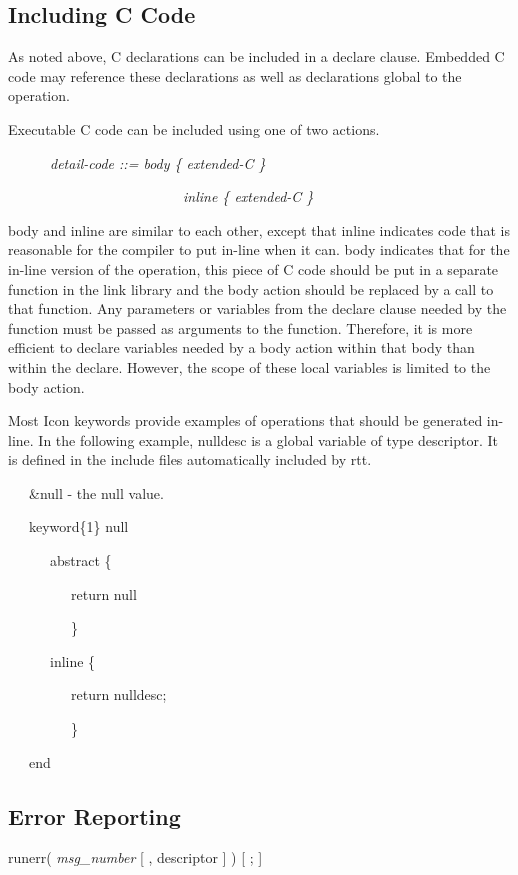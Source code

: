 \subsection{Including C Code}

As noted above, C declarations can be included in a declare
clause. Embedded C code may reference these declarations as well as
declarations global to the operation.

Executable C code can be included using one of two actions. 

{\ttfamily\mdseries
\ \ \ \ \ \ \textit{detail-code ::= body \{ extended-C \} {\textbar}}}

{\ttfamily\mdseries
\ \ \ \ \ \ \ \ \ \ \ \ \ \ \ \ \ \ \ \ \ \ \ \ \ \textit{inline \{ extended-C \}}}


body and inline are similar to each other, except that inline
indicates code that is reasonable for the compiler to put in-line when
it can. body indicates that for the in-line version of the operation,
this piece of C code should be put in a separate function in the link
library and the body action should be replaced by a call to that
function. Any parameters or variables from the declare clause needed
by the function must be passed as arguments to the function.
Therefore, it is more efficient to declare variables needed by a body
action within that body than within the declare.  However, the scope
of these local variables is limited to the body action.

Most Icon keywords provide examples of operations that should be
generated in-line. In the following example, nulldesc is a global
variable of type descriptor. It is defined in the include files
automatically included by rtt.

{\ttfamily\mdseries
\ \ \ \&null - the null value.}

{\ttfamily\mdseries
\ \ \ keyword\{1\} null}

{\ttfamily\mdseries
\ \ \ \ \ \ abstract \{}

{\ttfamily\mdseries
\ \ \ \ \ \ \ \ \ return null}

{\ttfamily\mdseries
\ \ \ \ \ \ \ \ \ \}}

{\ttfamily\mdseries
\ \ \ \ \ \ inline \{}

{\ttfamily\mdseries
\ \ \ \ \ \ \ \ \ return nulldesc;}

{\ttfamily\mdseries
\ \ \ \ \ \ \ \ \ \}}

{\ttfamily\mdseries
\ \ \ end}

\subsection{Error Reporting}
{\ttfamily\mdseries
runerr( \textit{msg\_number} [ , descriptor ] ) [ ; ]}


